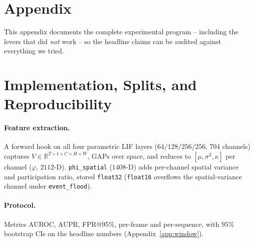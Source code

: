 ﻿\documentclass{article} %
\theoremstyle{remark}
\begin{document}



\appendix
\section*{Appendix}

\noindent This appendix documents the complete experimental program -- including the levers that
did \emph{not} work -- so the headline claims can be audited against everything we tried.

\section{Implementation, Splits, and Reproducibility}
\label{app:impl}

\paragraph{Feature extraction.} A forward hook on all four
parametric LIF layers ($64/128/256/256$, $704$ channels) captures
$V\in\mathbb{R}^{T\times1\times C\times H\times W}$, GAPs over space, and reduces to
$[\mu,\sigma^2,\kappa]$ per channel ($\varphi$, $2112$-D). \texttt{phi\_spatial} ($1408$-D) adds
per-channel spatial variance and participation ratio, stored \texttt{float32} (\texttt{float16}
overflows the spatial-variance channel under \texttt{event\_flood}).

\paragraph{Protocol.} Metrics AUROC, AUPR, FPR@95\%, per-frame and per-sequence, with $95\%$ bootstrap
CIs on the headline numbers (Appendix~\ref{app:window}).
\end{document}
